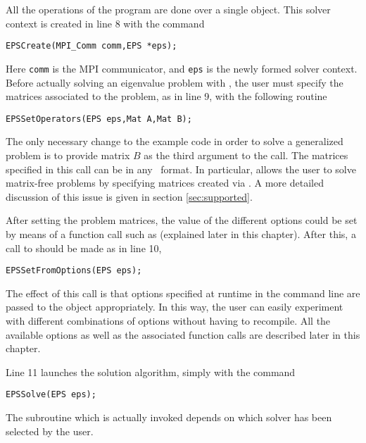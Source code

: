 	All the operations of the program are done over a single  object. This solver context is created in line 8 with the command 
	\begin{Verbatim}[fontsize=\small]
	EPSCreate(MPI_Comm comm,EPS *eps);
	\end{Verbatim}
	Here \texttt{comm} is the MPI communicator, and \texttt{eps} is the newly formed solver context. Before actually solving an eigenvalue problem with , the user must specify the matrices associated to the problem, as in line 9, with the following routine
	\begin{Verbatim}[fontsize=\small]
	EPSSetOperators(EPS eps,Mat A,Mat B);
	\end{Verbatim}
	The only necessary change to the example code in order to solve a generalized problem is to provide matrix $B$ as the third argument to the call. The matrices specified in this call can be in any \petsc\ format. In particular,  allows the user to solve matrix-free problems by specifying matrices created via . A more detailed discussion of this issue is given in section \ref{sec:supported}.

	After setting the problem matrices, the value of the different options could be set by means of a function call such as  (explained later in this chapter). After this, a call to  should be made as in line 10, 
	\begin{Verbatim}[fontsize=\small]
	EPSSetFromOptions(EPS eps);
	\end{Verbatim}
	The effect of this call is that options specified at runtime in the command line are passed to the  object appropriately. In this way, the user can easily experiment with different combinations of options without having to recompile. All the available options as well as the associated function calls are described later in this chapter.

	Line 11 launches the solution algorithm, simply with the command
	\begin{Verbatim}[fontsize=\small]
	EPSSolve(EPS eps);
	\end{Verbatim}
	The subroutine which is actually invoked depends on which solver has been selected by the user. 
        
